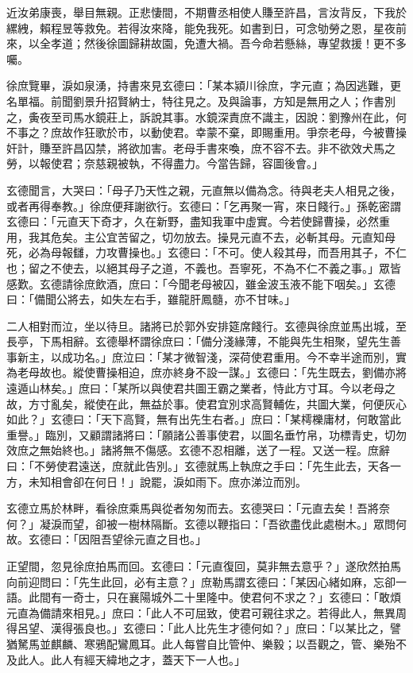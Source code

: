 近汝弟康喪，舉目無親。正悲悽間，不期曹丞相使人賺至許昌，言汝背反，下我於縲絏，賴程昱等救免。若得汝來降，能免我死。如書到日，可念劬勞之恩，星夜前來，以全孝道；然後徐圖歸耕故園，免遭大禍。吾今命若懸絲，專望救援！更不多囑。

徐庶覽畢，淚如泉湧，持書來見玄德曰：「某本潁川徐庶，字元直；為因逃難，更名單福。前聞劉景升招賢納士，特往見之。及與論事，方知是無用之人；作書別之，夤夜至司馬水鏡莊上，訴說其事。水鏡深責庶不識主，因說：劉豫州在此，何不事之？庶故作狂歌於市，以動使君。幸蒙不棄，即賜重用。爭奈老母，今被曹操奸計，賺至許昌囚禁，將欲加害。老母手書來喚，庶不容不去。非不欲效犬馬之勞，以報使君；奈慈親被執，不得盡力。今當告歸，容圖後會。」

玄德聞言，大哭曰：「母子乃天性之親，元直無以備為念。待與老夫人相見之後，或者再得奉教。」徐庶便拜謝欲行。玄德曰：「乞再聚一宵，來日餞行。」孫乾密謂玄德曰：「元直天下奇才，久在新野，盡知我軍中虛實。今若使歸曹操，必然重用，我其危矣。主公宜苦留之，切勿放去。操見元直不去，必斬其母。元直知母死，必為母報讎，力攻曹操也。」玄德曰：「不可。使人殺其母，而吾用其子，不仁也；留之不使去，以絕其母子之道，不義也。吾寧死，不為不仁不義之事。」眾皆感歎。玄德請徐庶飲酒，庶曰：「今聞老母被囚，雖金波玉液不能下咽矣。」玄德曰：「備聞公將去，如失左右手，雖龍肝鳳髓，亦不甘味。」

二人相對而泣，坐以待旦。諸將已於郭外安排筵席餞行。玄德與徐庶並馬出城，至長亭，下馬相辭。玄德舉杯謂徐庶曰：「備分淺緣薄，不能與先生相聚，望先生善事新主，以成功名。」庶泣曰：「某才微智淺，深荷使君重用。今不幸半途而別，實為老母故也。縱使曹操相迫，庶亦終身不設一謀。」玄德曰：「先生既去，劉備亦將遠遁山林矣。」庶曰：「某所以與使君共圖王霸之業者，恃此方寸耳。今以老母之故，方寸亂矣，縱使在此，無益於事。使君宜別求高賢輔佐，共圖大業，何便灰心如此？」玄德曰：「天下高賢，無有出先生右者。」庶曰：「某樗櫟庸材，何敢當此重譽。」臨別，又顧謂諸將曰：「願諸公善事使君，以圖名垂竹帛，功標青史，切勿效庶之無始終也。」諸將無不傷感。玄德不忍相離，送了一程。又送一程。庶辭曰：「不勞使君遠送，庶就此告別。」玄德就馬上執庶之手曰：「先生此去，天各一方，未知相會卻在何日！」說罷，淚如雨下。庶亦涕泣而別。

玄德立馬於林畔，看徐庶乘馬與從者匆匆而去。玄德哭曰：「元直去矣！吾將奈何？」凝淚而望，卻被一樹林隔斷。玄德以鞭指曰：「吾欲盡伐此處樹木。」眾問何故。玄德曰：「因阻吾望徐元直之目也。」

正望間，忽見徐庶拍馬而回。玄德曰：「元直復回，莫非無去意乎？」遂欣然拍馬向前迎問曰：「先生此回，必有主意？」庶勒馬謂玄德曰：「某因心緒如麻，忘卻一語。此間有一奇士，只在襄陽城外二十里隆中。使君何不求之？」玄德曰：「敢煩元直為備請來相見。」庶曰：「此人不可屈致，使君可親往求之。若得此人，無異周得呂望、漢得張良也。」玄德曰：「此人比先生才德何如？」庶曰：「以某比之，譬猶駑馬並麒麟、寒鴉配鸞鳳耳。此人每嘗自比管仲、樂毅；以吾觀之，管、樂殆不及此人。此人有經天緯地之才，蓋天下一人也。」

